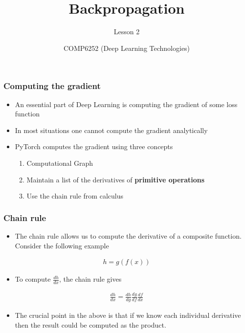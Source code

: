 \documentclass{beamer}
\title{Backpropagation}
\subtitle{Lesson 2}
\author{COMP6252 (Deep Learning Technologies)}
\institute[ECS, University of Southampton]{ECS, University of Southampton} \date{}
\theoremstyle{plain} %
\theoremstyle{example} %
\begin{document}
\begin{frame}
\placelogofalse %
\titlepage
\end{frame}

\placelogotrue %
\begin{frame}
    \frametitle{Computing the gradient}
\begin{itemize}
    \item An essential part of Deep Learning is computing the gradient of some loss function
    \item In most situations one cannot compute the gradient analytically
    \item PyTorch computes the gradient using three concepts
    \begin{enumerate}
        \item Computational Graph
        \item Maintain a list of the derivatives of \textbf{primitive operations}
        \item Use the chain rule from calculus
    \end{enumerate}
\end{itemize}
    

\end{frame}


\begin{frame}
    \frametitle{Chain rule}
\begin{itemize}
    \item The chain rule allows us to compute the derivative of a composite function. Consider the following example
\end{itemize}
\begin{align*}
    h=g(f(x))
\end{align*}
\begin{itemize}
    \item To  compute $\frac{dh}{dx}$, the chain rule gives
\end{itemize}    
\begin{align*}
    \frac{dh}{dx}=\frac{dh}{dg}\frac{dg}{df}\frac{df}{dx}
\end{align*}
\begin{itemize}
    \item The crucial point in the above is that if we know each individual derivative then the result could be computed as the product.
\end{itemize}
\end{frame}
\end{document}
